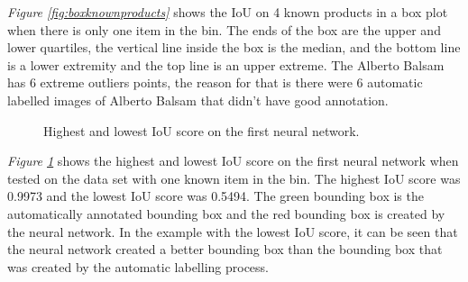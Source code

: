 \textit{Figure \ref{fig:boxknownproducts}} shows the IoU on 4 known products in a box plot when there is only one item in the bin. The ends of the box are the upper and lower quartiles, the vertical line inside the box is the median, and the bottom line is a lower extremity and the top line is an upper extreme. The Alberto Balsam has 6 extreme outliers points, the reason for that is there were 6 automatic labelled images of Alberto Balsam that didn’t have good annotation. 


\begin{figure}[h]
 \centering
 \hfill
 \caption{Highest and lowest IoU score on the first neural network.}
 \label{figure: v1bestworst}
\end{figure}

\textit{Figure \ref{figure: v1bestworst}} shows the highest and lowest IoU score on the first neural network when tested on the data set with one known item in the bin. The highest IoU score was 0.9973 and the lowest IoU score was 0.5494. The green bounding box is the automatically annotated bounding box and the red bounding box is created by the neural network. In the example with the lowest IoU score, it can be seen that the neural network created a better bounding box than the bounding box that was created by the automatic labelling process.

\clearpage

